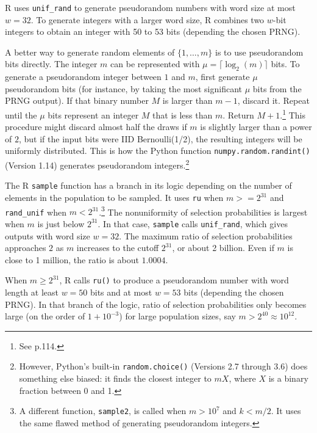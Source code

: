 \documentclass[12pt]{article}
\begin{document}
R uses \texttt{unif\_rand} to generate pseudorandom numbers with word size at most $w=32$.
To generate integers with a larger word size, R combines two $w$-bit integers to obtain an integer with 50 to 53 bits (depending the chosen PRNG). 

A better way to generate random elements of $\{1, \dots, m\}$ is to use pseudorandom bits directly. 
The integer $m$ can be represented with $\mu = \lceil \log_2(m) \rceil$ bits. 
To generate a pseudorandom integer between $1$ and $m$, first generate $\mu$ pseudorandom bits (for instance, by taking the most significant $\mu$ bits from the PRNG output).  
If that binary number $M$ is larger than $m-1$, discard it.
Repeat until the $\mu$ bits represent an integer $M$ that is less than $m$. 
Return $M+1$.\footnote{%
   See \citet{knuth_art_1997} p.114.
}
This procedure might discard almost half the draws if $m$ is slightly larger than a power of $2$,
but if the input bits were IID Bernoulli(1/2), the resulting integers will be uniformly distributed.
This is how the Python function \texttt{numpy.random.randint()} (Version 1.14) generates pseudorandom integers.\footnote{%
However, Python's built-in \texttt{random.choice()} (Versions 2.7 through 3.6) does something else biased: it finds the closest integer to $mX$, where $X$ is a binary fraction between 0 and 1.
}

The R \texttt{sample} function has a branch in its logic depending on the number of elements
in the population to be sampled. 
It uses \texttt{ru} when $m >= 2^{31}$ and \texttt{rand\_unif} when $m < 2^{31}$.\footnote{
A different function, \texttt{sample2}, is called when $m > 10^7$ and $k < m/2$.
It uses the same flawed method of generating pseudorandom integers.
}
The nonuniformity of selection probabilities is largest when $m$ is just below $2^{31}$. 
In that case, \texttt{sample} calls \texttt{unif\_rand}, which gives outputs with word size $w=32$. 
The maximum ratio of selection probabilities approaches $2$ as $m$ increases to the cutoff $2^{31}$, or about 2 billion. 
Even if $m$ is close to 1 million, the ratio is about $1.0004$.

When $m \ge 2^{31}$, R calls \texttt{ru()}  to produce a pseudorandom number with word length at least $w=50$ bits and at most $w=53$ bits (depending the chosen PRNG). 
In that branch of the logic, ratio of selection probabilities only becomes large (on the order of $1+10^{-3}$) for large population sizes, say $m > 2^{40} \approx 10^{12}$. 
\end{document}
